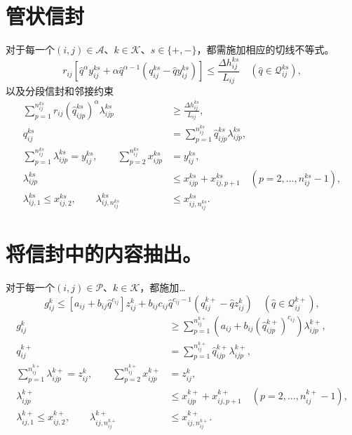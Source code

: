 \documentclass{article}
\begin{document}
\section*{管状信封}
对于每一个$(i,j)\in\mathcal A$、$k\in\mathcal K$、$s\in\{+,-\}$，都需施加相应的切线不等式。
\begin{equation}
r_{ij}\left[\widehat q^{\alpha}y_{ij}^{ks}
+\alpha\widehat q^{\alpha-1}(q_{ij}^{ks}-\widehat qy_{ij}^{ks})\right]
\le\frac{\Delta h_{ij}^{ks}}{L_{ij}}
\quad(\widehat q\in\mathcal Q_{ij}^{ks}),
\tag{18}
\end{equation}
以及分段信封和邻接约束
\begin{align}
\sum_{p=1}^{n_{ij}^{ks}}r_{ij}(\widehat q_{ijp}^{ks})^\alpha\lambda_{ijp}^{ks}
&\ge\frac{\Delta h_{ij}^{ks}}{L_{ij}}, \tag{22}\\
q_{ij}^{ks}&=\sum_{p=1}^{n_{ij}^{ks}}\widehat q_{ijp}^{ks}\lambda_{ijp}^{ks}, \tag{23}\\
\sum_{p=1}^{n_{ij}^{ks}}\lambda_{ijp}^{ks}=y_{ij}^{ks},\qquad
\sum_{p=2}^{n_{ij}^{ks}}x_{ijp}^{ks}&=y_{ij}^{ks}, \tag{24a}\\
\lambda_{ijp}^{ks}&\le x_{ijp}^{ks}+x_{ij,p+1}^{ks}
\quad(p=2,\ldots,n_{ij}^{ks}-1), \tag{24b}\\
\lambda_{ij,1}^{ks}\le x_{ij,2}^{ks},\qquad
\lambda_{ij,n_{ij}^{ks}}^{ks}&\le x_{ij,n_{ij}^{ks}}^{ks}. \tag{24c}
\end{align}

\section*{将信封中的内容抽出。}
对于每一个$(i,j)\in\mathcal P$、$k\in\mathcal K$，都施加…
\begin{equation}
g_{ij}^k\le[a_{ij}+b_{ij}\widehat q^{c_{ij}}]z_{ij}^k
+b_{ij}c_{ij}\widehat q^{c_{ij}-1}(q_{ij}^{k+}-\widehat qz_{ij}^k)
\quad(\widehat q\in\mathcal Q_{ij}^{k+}),
\tag{20}
\end{equation}
\begin{align}
g_{ij}^k&\ge\sum_{p=1}^{n_{ij}^{k+}}
\left(a_{ij}+b_{ij}(\widehat q_{ijp}^{k+})^{c_{ij}}\right)\lambda_{ijp}^{k+}, \tag{25}\\
q_{ij}^{k+}&=\sum_{p=1}^{n_{ij}^{k+}}\widehat q_{ijp}^{k+}\lambda_{ijp}^{k+}, \tag{26}\\
\sum_{p=1}^{n_{ij}^{k+}}\lambda_{ijp}^{k+}=z_{ij}^k,\qquad
\sum_{p=2}^{n_{ij}^{k+}}x_{ijp}^{k+}&=z_{ij}^k, \tag{27a}\\
\lambda_{ijp}^{k+}&\le x_{ijp}^{k+}+x_{ij,p+1}^{k+}
\quad(p=2,\ldots,n_{ij}^{k+}-1), \tag{27b}\\
\lambda_{ij,1}^{k+}\le x_{ij,2}^{k+},\qquad
\lambda_{ij,n_{ij}^{k+}}^{k+}&\le x_{ij,n_{ij}^{k+}}^{k+}. \tag{27c}
\end{align}
\end{document}
